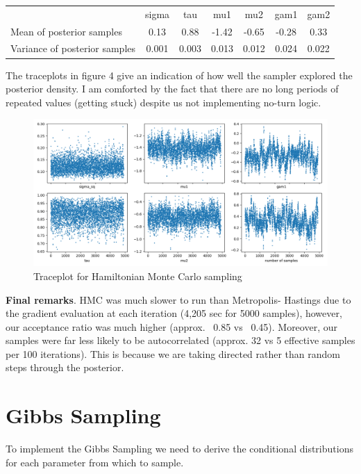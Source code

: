 \documentclass[12pt,letterpaper,twoside]{article}
\begin{document}
\begin{table}[H]
    \begin{tabular}{lcccccc}
    \multicolumn{1}{c}{}          & sigma & tau   & mu1   & mu2   & gam1  & gam2  \\
    Mean of posterior samples     & 0.13  & 0.88  & -1.42 & -0.65 & -0.28 & 0.33  \\
    Variance of posterior samples & 0.001 & 0.003 & 0.013 & 0.012 & 0.024 & 0.022
    \end{tabular}
\end{table}

The traceplots in figure 4 give an indication of how well the sampler 
explored the posterior density. I am comforted by the fact that 
there are no long periods of repeated values (getting stuck) 
despite us not implementing no-turn logic. 
\begin{figure}[H]
    \centering
    \includegraphics[scale=0.55]{hmc_sampled_traceplot.png}
    \caption{Traceplot for Hamiltonian Monte Carlo sampling}
\end{figure}

\textbf{Final remarks}. HMC was much slower to run than Metropolis-
Hastings due to the gradient evaluation at each iteration (4,205 sec 
for 5000 samples), however, our acceptance ratio was much higher 
(approx. ~0.85 vs ~0.45). Moreover, our samples were far less likely 
to be autocorrelated (approx. 32 vs 5 effective samples per 100 
iterations). This is because we are taking directed rather than 
random steps through the posterior.



\section{Gibbs Sampling}
To implement the Gibbs Sampling we need to derive the conditional 
distributions for each parameter from which to sample. 
\end{document}
